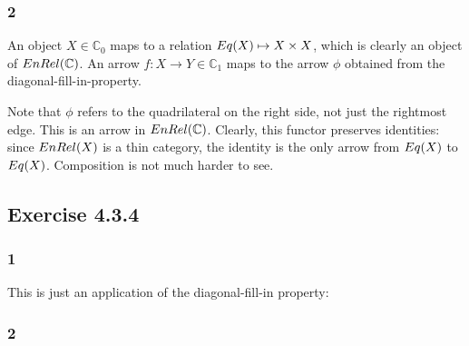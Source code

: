 \documentclass{article}
\begin{document}
\subsubsection*{2}

An object $X \in \mathbb C_0$ maps to a relation $\mit{Eq}(X) \mapsto X \times X$, which is clearly an object
of $\mit{EnRel}(\mathbb C)$. An arrow $f : X \to Y \in \mathbb C_1$ maps to the arrow $\phi$ obtained from the diagonal-fill-in-property. 

\begin{center}
\end{center} 

Note that $\phi$ refers to the quadrilateral on the right side, not just the rightmost edge. This is an arrow in $\mit{EnRel}(\mathbb C)$. Clearly, this functor preserves identities: since $\mit{EnRel}(X)$ is a thin category, the identity is the only
arrow from $\mit{Eq}(X)$ to $\mit{Eq}(X)$. Composition is not much harder to see.

\subsection*{Exercise 4.3.4}

\subsubsection*{1}

This is just an application of the diagonal-fill-in property:

\begin{center}
\end{center}

\subsubsection*{2}
\end{document}
